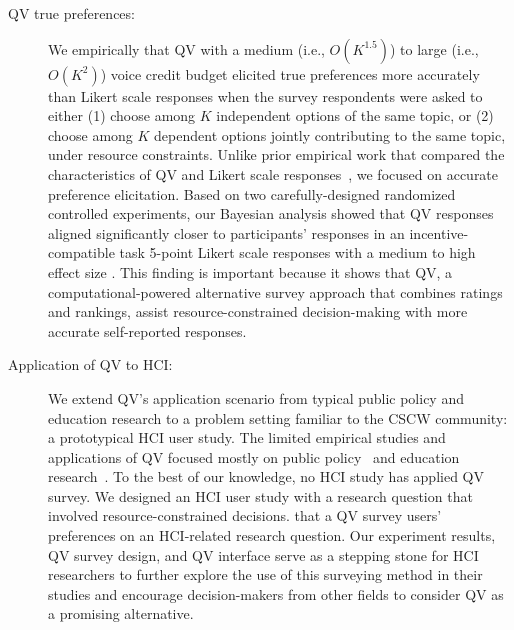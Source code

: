 \begin{description}
\item[QV {} true preferences:] We empirically {} that QV with a medium (i.e., $O(K^{1.5})$) to large (i.e., $O(K^{2})$) voice credit budget elicited true preferences more accurately than Likert scale responses when the survey respondents were asked to either (1) choose among $K$ independent options of the same topic, or (2) choose among $K$ dependent options jointly contributing to the same topic, under resource constraints. Unlike prior empirical work that compared the characteristics of QV and Likert scale responses~\cite{quarfoot2017quadratic, naylor2017first}, we focused on accurate preference elicitation. Based on two carefully-designed randomized controlled experiments, our Bayesian analysis showed that QV responses aligned significantly closer to participants' responses in an incentive-compatible task {} 5-point Likert scale responses with a medium to high effect size {}. This finding is important because it shows that QV, a computational-powered alternative survey approach that combines ratings and rankings, {} assist resource-constrained decision-making with more accurate self-reported responses.

\item[Application of QV to HCI:] We extend QV's application scenario from typical public policy and education research to a problem setting familiar to the CSCW community: a prototypical HCI user study. The limited {} empirical studies and applications of QV focused mostly on public policy~\cite{quarfoot2017quadratic, colorado_qv} and education research~\cite{naylor2017first}. To the best of our knowledge, no {} HCI study has applied QV {} survey. We designed an HCI user study with a research question that involved resource-constrained decisions. {} that a QV survey {} users' preferences on an HCI-related research question. Our experiment results, QV survey design, and QV interface serve as a stepping stone for HCI researchers to further explore the use of this surveying method in their studies and encourage decision-makers from other fields to consider QV as a promising alternative.
\end{description}

